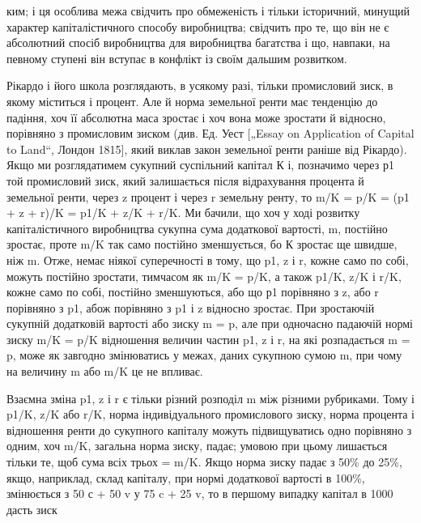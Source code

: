ким; і ця особлива межа свідчить про обмеженість і тільки
історичний, минущий характер капіталістичного способу виробництва;
свідчить про те, що він не є абсолютний спосіб виробництва
для виробництва багатства і що, навпаки, на певному
ступені він вступає в конфлікт із своїм дальшим розвитком.

Рікардо і його школа розглядають, в усякому разі, тільки промисловий
зиск, в якому міститься і процент. Але й норма земельної
ренти має тенденцію до падіння, хоч її абсолютна маса зростає
і хоч вона може зростати й відносно, порівняно з промисловим
зиском (див. Ед. Уест [„Essay on Application of Capital to Land“,
Лондон 1815], який виклав закон земельної ренти раніше від
Рікардо). Якщо ми розглядатимем сукупний суспільний капітал
К і, позначимо через р1 той промисловий зиск, який залишається
після відрахування процента й земельної ренти, через z
процент і через r земельну ренту, то m/K = p/K = (p1 + z + r)/K =
p1/K + z/K + r/K. Ми бачили, що хоч у ході розвитку капіталістичного
виробництва сукупна сума додаткової вартості, m, постійно
зростає, проте m/K так само постійно зменшується, бо К
зростає ще швидше, ніж m. Отже, немає ніякої суперечності
в тому, що p1, z і r, кожне само по собі, можуть постійно зростати,
тимчасом як m/K = p/K, а також p1/K, z/K і r/K, кожне само
по собі, постійно зменшуються, або що р1 порівняно з z, або
r порівняно з p1, абож порівняно з p1 і z відносно зростає.
При зростаючій сукупній додатковій вартості або зиску m = p, але
при одночасно падаючій нормі зиску m/K = p/K відношення величин
частин p1, z і r, на які розпадається m = p, може як завгодно
змінюватись у межах, даних сукупною сумою m, при чому
на величину m або m/K це не впливає.

Взаємна зміна p1, z і r є тільки різний розподіл m між різними
рубриками. Тому і p1/K, z/K або r/K, норма індивідуального
промислового зиску, норма процента і відношення ренти до
сукупного капіталу можуть підвищуватись одно порівняно з одним,
хоч m/K, загальна норма зиску, падає; умовою при цьому
лишається тільки те, щоб сума всіх трьох = m/K. Якщо норма
зиску падає з 50\% до 25\%, якщо, наприклад, склад капіталу,
при нормі додаткової вартості в 100\%, змінюється з 50 с + 50 v
у 75 c + 25 v, то в першому випадку капітал в 1000 дасть зиск
